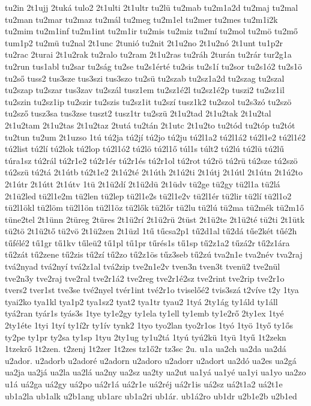 {tu2in
2t1ujj
2tuká
tulo2
2t1ulti
2t1ultr
tu2lü
tu2mab
tu2m1a2d
tu2maj
tu2mal
tu2man
tu2mar
tu2maz
tu2mál
tu2meg
tu2m1el
tu2mer
tu2mes
tu2m1i2k
tu2mim
tu2m1inf
tu2m1int
tu2m1ir
tu2mis
tu2miz
tu2mí
tu2mol
tu2mö
tu2mő
tum1p2
tu2mü
tu2nal
2t1unc
2tunió
tu2nit
2t1u2no
2t1u2nó
2t1unt
tu1p2r
tu2rac
2turai
2t1u2rak
tu2ralo
tu2ram
2t1u2ras
tu2ráh
2turán
tu2rár
tur2g1a
tu2run
tus1abl
tu2sar
tu2ság
tu2se
tu2s1érté
tu2sis
tu2s1í
tu2sor
tu2s1ó2
tu2s1ö
tu2ső
tuss2
tus3sze
tus3szi
tus3szo
tu2sü
tu2szab
tu2sz1a2d
tu2szag
tu2szal
tu2szap
tu2szar
tus3zav
tu2szál
tusz1em
tu2sz1é2l
tu2sz1é2p
tuszi2
tu2sz1il
tu2szin
tu2sz1ip
tu2szir
tu2szis
tu2sz1it
tu2szí
tusz1k2
tu2szol
tu2s3zó
tu2szö
tu2sző
tusz3sa
tus3zse
tuszt2
tusz1tr
tu2szü
2t1u2tad
2t1u2tak
2t1u2tal
2t1u2tam
2t1u2tas
2t1u2taz
2tutá
tu2tán
2t1utc
2t1u2to
tu2tód
tu2tóp
tu2tót
tu2tun
tu2um
2t1uzso
1tú
tú2ja
tú2jí
tú2jo
tú2ju
tú2l1a2
tú2l1á2
tú2l1e2
tú2l1é2
tú2list
tú2lí
tú2lok
tú2lop
tú2l1ó2
tú2lö
tú2l1ő
túl1s
túlt2
tú2lú
tú2lü
tú2lű
túra1sz
tú2rál
tú2r1e2
tú2r1ér
tú2r1és
tú2r1ol
tú2rot
tú2rö
tú2rü
tú2sze
tú2szö
tú2szü
tú2tá
2t1útb
tú2t1e2
2t1ú2té
2t1úth
2t1ú2ti
2t1útj
2t1útl
2t1útn
2t1ú2to
2t1útr
2t1útt
2t1útv
1tü
2t1ü2dí
2t1ü2dü
2t1üdv
tü2ge
tü2gy
tü2l1a
tü2lá
2t1ü2led
tü2l1e2m
tü2len
tü2lep
tü2l1e2s
tü2l1e2v
tü2l1ér
tü2lir
tü2lí
tü2l1o2
tü2l1ökl
tü2löm
tü2l1ön
tü2l1öz
tü2lők
tü2lőr
tü2lu
tü2lú
tü2ma
tü2mék
tü2m1ő
tüne2tel
2t1ünn
2türeg
2türes
2t1ü2rí
2t1ü2rü
2tüst
2t1ü2te
2t1ü2té
tü2ti
2t1ütk
tü2tö
2t1ü2tő
tü2vö
2t1ü2zen
2t1üzl
1tű
tűcsa2p1
tű2d1al
tű2dá
tűe2két
tűé2h
tűfélé2
tű1gr
tű1kv
tűleü2
tű1pl
tű1pr
tűrés1s
tű1sp
tű2z1a2
tűzá2r
tű2z1ára
tű2zát
tű2zene
tű2zis
tű2zí
tű2zo
tű2z1ös
tűz3seb
tű2zú
tva2n1e
tva2név
tva2raj
tvá2nyad
tvá2nyí
tvá2z1al
tvá2zip
tve2n1e2v
tven3n
tven3t
tvenü2
tve2nül
tve2n3y
tve2raj
tve2ral
tve2r1á2
tve2reg
tve2r1é2sz
tve2rint
tve2rip
tve2r1o
tvers2
tver1st
tve3se
tvé2nyel
tvér1int
tvé2r1o
tviselőé2
tvis3szá
t2víve
t2y
1tya
tyai2ko
tya1kl
tya1p2
tya1sz2
tyat2
tya1tr
tyau2
1tyá
2ty1ág
ty1áld
ty1áll
tyá2ran
tyár1s
tyás3s
1tye
ty1e2gy
ty1ela
ty1ell
ty1emb
ty1e2rő
2ty1ex
1tyé
2ty1éte
1tyi
1tyí
ty1í2r
ty1ív
tynk2
1tyo
tyo2lan
tyo2r1os
1tyó
1työ
1tyő
ty1ős
ty2pe
ty1pr
ty2sa
ty1sp
1tyu
2ty1ug
ty1u2tá
1tyú
tyú2kü
1tyü
1tyű
1t2zekn
1tzekrő
1t2zen.
t2zenj
1t2zer
1t2zes
tz1ő2r
tz3sc
2u.
u1a
ua2ch
ua2da
ua2dá
u2ador.
u2adorb
u2adoré
u2adorn
u2adoro
u2adorr
u2adort
ua2dó
ua2es
ua2gá
ua2ja
ua2já
ua2la
ua2lá
ua2ny
ua2sz
ua2ty
ua2ut
ua1yá
ua1yé
ua1yi
ua1yo
ua2zo
u1á
uá2ga
uá2gy
uá2po
uá2r1á
uá2r1e
uá2réj
uá2r1is
uá2sz
uá2t1a2
uá2t1e
ub1a2la
ub1alk
u2b1ang
ub1arc
ub1a2ri
ub1ár.
ub1á2ro
ub1dr
u2b1e2b
u2b1ed
}
